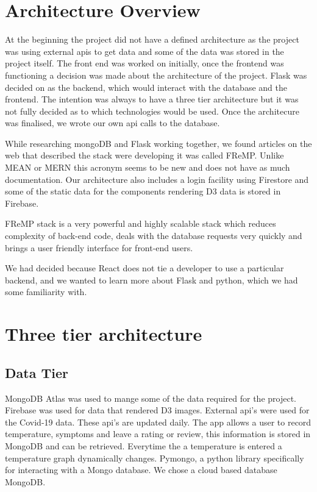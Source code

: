 \section{Architecture Overview}
At the beginning  the project did not have a defined architecture as the project was using external apis to get data and some of the data was stored in the project itself. The front end was worked on initially, once the frontend was functioning a decision was made about the architecture of the project. Flask was decided on as the backend, which would interact with the database and the frontend.
The intention was always to have a three tier architecture but it was not fully decided as to which technologies would be used. Once the architecure was finalised, we wrote our own api calls to the database. 


While researching mongoDB and Flask working together, we found articles on the web that described the stack were developing it was called FReMP. Unlike MEAN or MERN this acronym seems to be new and does not have as much documentation. Our architecture also includes a login facility using Firestore and some of the static data for the components rendering D3 data is stored in Firebase. 

FReMP stack is a very powerful and highly scalable stack which reduces complexity of back-end code, deals with the database requests very quickly and brings a user friendly interface for front-end users.

We had decided because React does not tie a developer to use a particular backend, and we wanted to learn more about Flask and python, which we had some familiarity with.  



\section{Three tier architecture}
\subsection{Data Tier}
MongoDB Atlas was used to mange some of the data required for the project. Firebase was used for data that rendered D3 images. External api's were used for the Covid-19 data. These api's are updated daily. The app allows a user to record temperature, symptoms and leave a rating or review, this information is stored in MongoDB and can be retrieved. Everytime the a temperature is entered a temperature graph dynamically changes. Pymongo, a python library specifically for interacting with a Mongo database. We chose a cloud based database MongoDB.

